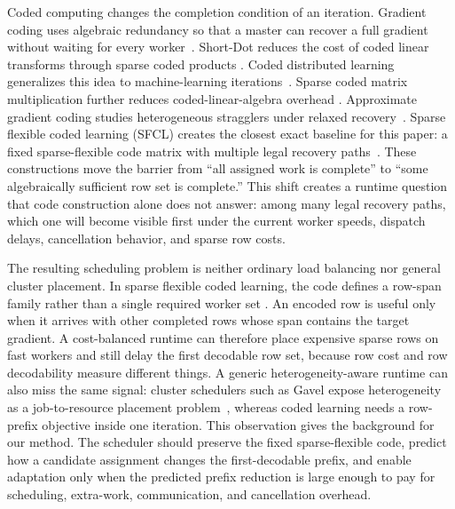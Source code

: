 Coded computing changes the completion condition of an iteration.  Gradient
coding uses algebraic redundancy so that a master can recover a full gradient
without waiting for every worker~\cite{tandon2017gradient}.  Short-Dot reduces
the cost of coded linear transforms through sparse coded products
\cite{dutta2016shortdot}.  Coded distributed learning generalizes this idea to
machine-learning iterations~\cite{lee2018speeding}.  Sparse coded matrix
multiplication further reduces coded-linear-algebra overhead
\cite{wang2018codedsparse}.  Approximate gradient coding studies heterogeneous
stragglers under relaxed recovery~\cite{song2025approxgc}.  Sparse flexible
coded learning (SFCL) creates the closest exact baseline for this paper: a
fixed sparse-flexible code matrix with multiple legal recovery
paths~\cite{zhang2025sparseflexible}.
These constructions move the barrier from ``all assigned work is complete'' to
``some algebraically sufficient row set is complete.''  This shift creates a
runtime question that code construction alone does not answer: among many legal
recovery paths, which one will become visible first under the current worker
speeds, dispatch delays, cancellation behavior, and sparse row costs.

The resulting scheduling problem is neither ordinary load balancing nor
general cluster placement.  In sparse flexible coded learning, the code defines
a row-span family rather than a single required worker set
\cite{zhang2025sparseflexible}.  An encoded row is useful only when it arrives
with other completed rows whose span contains the target gradient.  A
cost-balanced runtime can therefore place expensive sparse rows on fast workers
and still delay the first decodable row set, because row cost and row
decodability measure different things.  A generic heterogeneity-aware runtime
can also miss the same signal: cluster schedulers such as Gavel expose
heterogeneity as a job-to-resource placement problem~\cite{narayanan2020gavel},
whereas coded learning needs a row-prefix objective inside one iteration.  This
observation gives the background for our method.  The scheduler should preserve
the fixed
sparse-flexible code, predict how a candidate assignment changes the
first-decodable prefix, and enable adaptation only when the predicted prefix
reduction is large enough to pay for scheduling, extra-work, communication, and
cancellation overhead.


